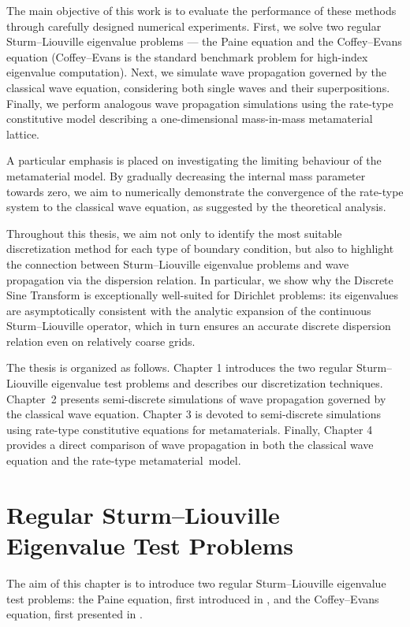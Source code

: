 \documentclass[11pt,a4paper,oneside,openright]{report} %
\begin{document}
The main objective of this work is to evaluate the performance of these methods through carefully designed numerical experiments. First, we solve two regular Sturm--Liouville eigenvalue problems — the Paine equation and the Coffey--Evans equation (Coffey--Evans is the standard benchmark problem for high-index eigenvalue computation). Next, we simulate wave propagation governed by the classical wave equation, considering both single waves and their superpositions. Finally, we perform analogous wave propagation simulations using the rate-type constitutive model describing a one-dimensional mass-in-mass metamaterial lattice.

A particular emphasis is placed on investigating the limiting behaviour of the metamaterial model. By gradually decreasing the internal mass parameter towards zero, we aim to numerically demonstrate the convergence of the rate-type system to the classical wave equation, as suggested by the theoretical analysis.

Throughout this thesis, we aim not only to identify the most suitable discretization method for each type of boundary condition, but also to highlight the connection between Sturm--Liouville eigenvalue problems and wave propagation via the dispersion relation. In particular, we show why the Discrete Sine Transform is exceptionally well-suited for Dirichlet problems: its eigenvalues are asymptotically consistent with the analytic expansion of the continuous Sturm--Liouville operator, which in turn ensures an accurate discrete dispersion relation even on relatively coarse grids.

The thesis is organized as follows. Chapter 1 introduces the two regular Sturm--Liouville eigenvalue test problems and describes our discretization techniques. \hbox{Chapter 2} presents semi-discrete simulations of wave propagation governed by the classical wave equation. Chapter 3 is devoted to semi-discrete simulations using rate-type constitutive equations for metamaterials. Finally, Chapter 4 provides a direct comparison of wave propagation in both the classical wave equation and the rate-type metamaterial~model.

\chapter{Regular Sturm--Liouville Eigenvalue Test Problems}
\noindent
The aim of this chapter is to introduce two regular Sturm--Liouville eigenvalue test problems: the Paine equation, first introduced in \cite{paine}, and the Coffey--Evans equation, first presented in \cite{pryce}.
\end{document}
